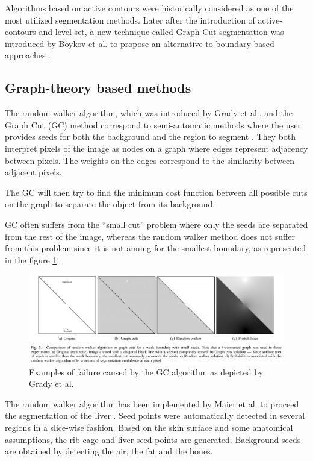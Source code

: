 \documentclass[]{article}
\begin{document}
	Algorithms based on active contours were historically considered as one
	of the most utilized segmentation methods. Later after the introduction
	of active-contours and level set, a new technique called Graph Cut
	segmentation was introduced by Boykov et al. to propose an alternative to boundary-based approaches \cite{Boykov2001}.
	
	\subsection*{Graph-theory based methods}
	
	The random walker algorithm, which was introduced by Grady et al., and the Graph Cut (GC) method correspond to
	semi-automatic methods where the user provides seeds for both the
	background and the region to segment \cite{Grady2006}. They both interpret pixels of the
	image as nodes on a graph where edges represent adjacency between
	pixels. The weights on the edges correspond to the similarity between
	adjacent pixels.
	
	The GC will then try to find the minimum cost function between all
	possible cuts on the graph to separate the object from its background.
	
	GC often suffers from the ``small cut'' problem where only the seeds are
	separated from the rest of the image, whereas the random walker method
	does not suffer from this problem since it is not aiming for the
	smallest boundary, as represented in the figure \ref{Grady2006_Fig5}.
	
	\begin{figure}[th!]
		\centering
		\includegraphics[width=0.7\linewidth]{images/image20}
		\caption{Examples of failure caused by the GC algorithm as depicted by Grady et al. \cite{Grady2006}}
		\label{Grady2006_Fig5}
	\end{figure}
	
	
	The random walker algorithm has been implemented by Maier et al. to proceed the segmentation of the liver \cite{Maier2008}. Seed points were
	automatically detected in several regions in a slice-wise fashion. Based
	on the skin surface and some anatomical assumptions, the rib cage and
	liver seed points are generated. Background seeds are obtained by
	detecting the air, the fat and the bones.
	
\end{document}
